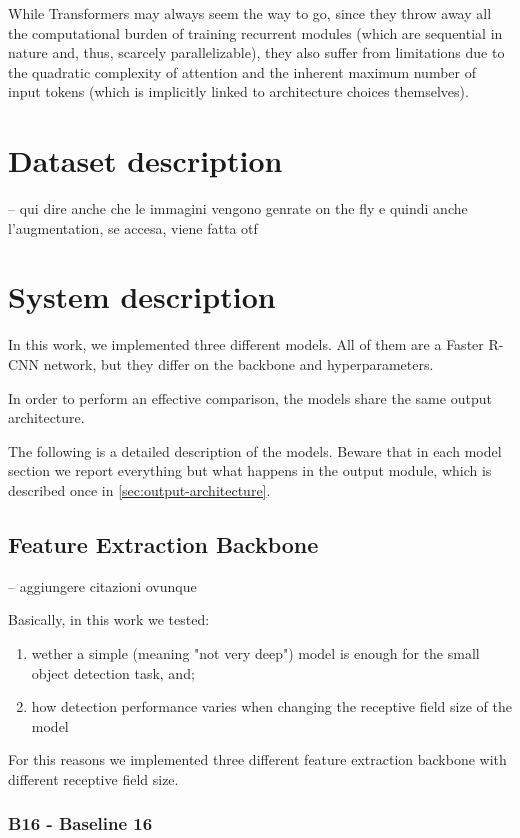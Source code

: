 \documentclass[a4paper,10pt]{report}
\begin{document}
While Transformers may always seem the way to go, since they throw away all the computational burden of training recurrent modules (which are sequential in nature and, thus, scarcely parallelizable), they also suffer from limitations due to the quadratic complexity of attention and the inherent maximum number of input tokens (which is implicitly linked to architecture choices themselves).

\chapter{Dataset description}\label{chap:dataset-description}

-- qui dire anche che le immagini vengono genrate on the fly e quindi anche l'augmentation, se accesa, viene fatta otf
\chapter{System description}\label{chap:system-description}

In this work, we implemented three different models. All of them are a Faster R-CNN network, but they differ on the backbone and hyperparameters.

In order to perform an effective comparison, the models share the same output architecture.

The following is a detailed description of the models. Beware that in each model section we report everything but what happens in the output module, which is described once in \ref{sec:output-architecture}.

\section{Feature Extraction Backbone}\label{sec:feature-extraction-backbone}
-- aggiungere citazioni ovunque

Basically, in this work we tested:
\begin{enumerate}
\item wether a simple (meaning "not very deep") model is enough for the small object detection task, and;
\item how detection performance varies when changing the receptive field size of the model
\end{enumerate}

For this reasons we implemented three different feature extraction backbone with different receptive field size.

\subsection{B16 - Baseline 16}\label{subsec:b16}
\end{document}
